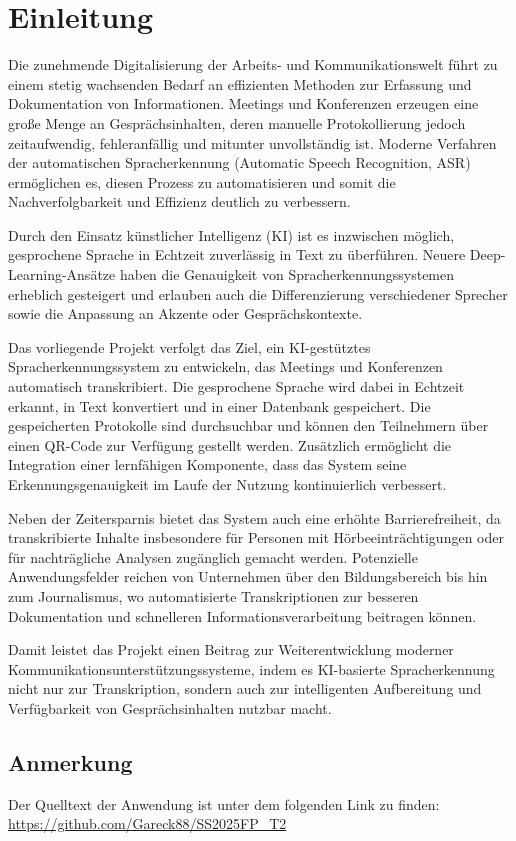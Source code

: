 \chapter{Einleitung}

Die zunehmende Digitalisierung der Arbeits- und Kommunikationswelt führt zu einem stetig wachsenden Bedarf an effizienten Methoden zur Erfassung und Dokumentation von Informationen. Meetings und Konferenzen erzeugen eine große Menge an Gesprächsinhalten, deren manuelle Protokollierung jedoch zeitaufwendig, fehleranfällig und mitunter unvollständig ist. Moderne Verfahren der automatischen Spracherkennung (Automatic Speech Recognition, ASR) ermöglichen es, diesen Prozess zu automatisieren und somit die Nachverfolgbarkeit und Effizienz deutlich zu verbessern.

Durch den Einsatz künstlicher Intelligenz (KI) ist es inzwischen möglich, gesprochene Sprache in Echtzeit zuverlässig in Text zu überführen. Neuere Deep-Learning-Ansätze haben die Genauigkeit von Spracherkennungssystemen erheblich gesteigert und erlauben auch die Differenzierung verschiedener Sprecher sowie die Anpassung an Akzente oder Gesprächskontexte.

Das vorliegende Projekt verfolgt das Ziel, ein KI-gestütztes Spracherkennungssystem zu entwickeln, das Meetings und Konferenzen automatisch transkribiert. Die gesprochene Sprache wird dabei in Echtzeit erkannt, in Text konvertiert und in einer Datenbank gespeichert. Die gespeicherten Protokolle sind durchsuchbar und können den Teilnehmern über einen QR-Code zur Verfügung gestellt werden. Zusätzlich ermöglicht die Integration einer lernfähigen Komponente, dass das System seine Erkennungsgenauigkeit im Laufe der Nutzung kontinuierlich verbessert.

Neben der Zeitersparnis bietet das System auch eine erhöhte Barrierefreiheit, da transkribierte Inhalte insbesondere für Personen mit Hörbeeinträchtigungen oder für nachträgliche Analysen zugänglich gemacht werden. Potenzielle Anwendungsfelder reichen von Unternehmen über den Bildungsbereich bis hin zum Journalismus, wo automatisierte Transkriptionen zur besseren Dokumentation und schnelleren Informationsverarbeitung beitragen können.

Damit leistet das Projekt einen Beitrag zur Weiterentwicklung moderner Kommunikationsunterstützungssysteme, indem es KI-basierte Spracherkennung nicht nur zur Transkription, sondern auch zur intelligenten Aufbereitung und Verfügbarkeit von Gesprächsinhalten nutzbar macht.

\section*{Anmerkung}
Der Quelltext der Anwendung ist unter dem folgenden Link zu finden: \url{https://github.com/Gareck88/SS2025FP\_T2}